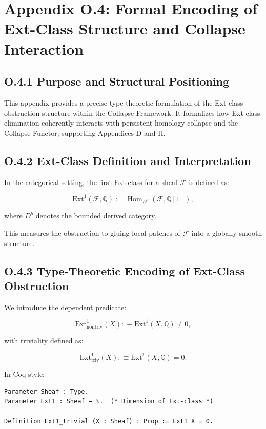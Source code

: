 \documentclass[11pt]{article}
\begin{document}
\section*{Appendix O.4: Formal Encoding of Ext-Class Structure and Collapse Interaction}

\subsection*{O.4.1 Purpose and Structural Positioning}

This appendix provides a precise type-theoretic formulation of the Ext-class obstruction structure within the Collapse Framework.  
It formalizes how Ext-class elimination coherently interacts with persistent homology collapse and the Collapse Functor, supporting Appendices D and H.

\subsection*{O.4.2 Ext-Class Definition and Interpretation}

In the categorical setting, the first Ext-class for a sheaf \( \mathcal{F} \) is defined as:

\[
\mathrm{Ext}^1(\mathcal{F}, \mathbb{Q}) := \operatorname{Hom}_{D^b}\left(\mathcal{F}, \mathbb{Q}[1]\right),
\]

where \( D^b \) denotes the bounded derived category.

This measures the obstruction to gluing local patches of \( \mathcal{F} \) into a globally smooth structure.

\subsection*{O.4.3 Type-Theoretic Encoding of Ext-Class Obstruction}

We introduce the dependent predicate:

\[
\mathrm{Ext}^1_{\mathrm{nontriv}}(X) :\equiv \mathrm{Ext}^1(X, \mathbb{Q}) \neq 0,
\]

with triviality defined as:

\[
\mathrm{Ext}^1_{\mathrm{triv}}(X) :\equiv \mathrm{Ext}^1(X, \mathbb{Q}) = 0.
\]

In Coq-style:

\begin{lstlisting}[language=Coq]
Parameter Sheaf : Type.
Parameter Ext1 : Sheaf → ℕ.  (* Dimension of Ext-class *)

Definition Ext1_trivial (X : Sheaf) : Prop := Ext1 X = 0.
\end{lstlisting}
\end{document}

